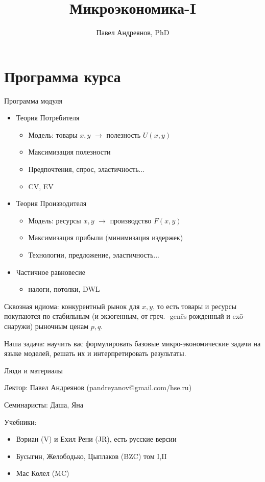 \documentclass{beamer}
\title{
Микроэкономика-I
}
\author{
Павел Андреянов, PhD
}
\begin{document}
\maketitle

\section{Программа курса}

\begin{frame}{Программа модуля}
\begin{itemize}
\item Теория Потребителя
\begin{itemize}
\item Модель: товары $x, y$ $\to$ полезность $U(x,y)$
\item Максимизация полезности
\item Предпочтения, спрос, эластичность...
\item CV, EV
\end{itemize}
\item Теория Производителя
\begin{itemize}
\item Модель: ресурсы $x, y$ $\to$ производство $F(x,y)$
\item Максимизация прибыли (минимизация издержек)
\item Технологии, предложение, эластичность...
\end{itemize}
\item Частичное равновесие
\begin{itemize}
\item налоги, потолки, DWL
\end{itemize}
\end{itemize}
\end{frame}

\begin{frame}

Сквозная идиома: \alert{конкурентный рынок} для $x, y$, то есть товары и ресурсы покупаются по стабильным (и \alert{экзогенным}, от греч. -genēs рожденный и  exō- снаружи) рыночным ценам $p, q$. 

Наша задача: научить вас формулировать базовые микро-экономические задачи на языке моделей, решать их и интерпретировать результаты.

\end{frame}

\begin{frame}{Люди и материалы}

Лектор: Павел Андреянов (pandreyanov@gmail.com/hse.ru)

Семинаристы: Даша, Яна

Учебники:
\begin{itemize}
\item Вэриан (V) и Ехил Рени (JR), есть русские версии
\item Бусыгин, Желободько, Цыплаков (BZC) том I,II
\item Мас Колел (MC)
\end{itemize}

\end{frame}
\end{document}

